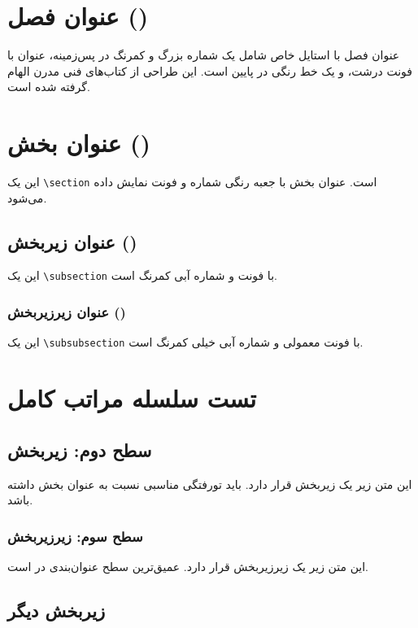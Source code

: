\documentclass{matinbook}
\begin{document}
\section{عنوان فصل ()}

عنوان فصل با استایل خاص  شامل یک شماره بزرگ
و کمرنگ در پس‌زمینه، عنوان با فونت درشت، و یک خط رنگی
در پایین است. این طراحی از کتاب‌های فنی مدرن الهام گرفته
شده است.

\section{عنوان بخش ()}

این یک \texttt{\textbackslash section} است. عنوان بخش
با جعبه رنگی شماره و فونت  نمایش داده می‌شود.

\subsection{عنوان زیربخش ()}

این یک \texttt{\textbackslash subsection} با فونت 
و شماره آبی کمرنگ است.

\subsubsection{عنوان زیرزیربخش ()}

این یک \texttt{\textbackslash subsubsection} با فونت
معمولی و شماره آبی خیلی کمرنگ است.

\section{تست سلسله مراتب کامل}

\subsection{سطح دوم: زیربخش}

این متن زیر یک زیربخش قرار دارد. باید تورفتگی مناسبی
نسبت به عنوان بخش داشته باشد.

\subsubsection{سطح سوم: زیرزیربخش}

این متن زیر یک زیرزیربخش قرار دارد. عمیق‌ترین سطح
عنوان‌بندی در  است.

\subsection{زیربخش دیگر}
\end{document}
